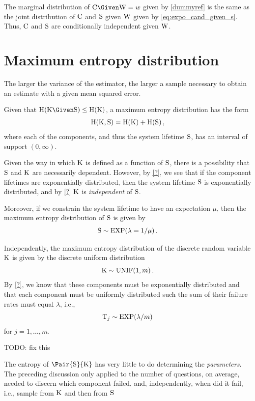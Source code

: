 \documentclass[../main.tex]{subfiles}
\begin{document}
The marginal distribution of $\rvcand \Given \RV{W} = w$ given by \cref{dummyref} is the same as the joint distribution of $\mathrm{C}$ and $\mathrm{S}$ given 
$\mathrm{W}$ given by \cref{eq:expo_cand_given_s}.
Thus, $\mathrm{C}$ and $\mathrm{S}$ are conditionally independent given $\mathrm{W}$.

\section{Maximum entropy distribution}
The larger the variance of the estimator, the larger a sample necessary to obtain an estimate with a given mean squared error.

Given that $\entropy(\RV{K} \Given \sv) \leq \entropy(\RV{K})$, a maximum entropy distribution has the form
\begin{equation}
\operatorname{H}(\mathrm{K}, \mathrm{S}) = \operatorname{H}(\mathrm{K}) + \operatorname{H}(\mathrm{S})\,,
\end{equation}
where each of the components, and thus the system lifetime $\mathrm{S}$, has an interval of support $(0,\infty)$.

Given the way in which $\mathrm{K}$ is defined as a function of $\mathrm{S}$, there is a possibility that $\mathrm{S}$ and $\mathrm{K}$ are necessarily dependent.
However, by \cref{?}, we see that if the component lifetimes are exponentially distributed, then the system lifetime $\mathrm{S}$ is exponentially distributed, and by \cref{?} $\mathrm{K}$ is \emph{independent} of $\mathrm{S}$.

Moreover, if we constrain the system lifetime to have an expectation $\mu$, then the maximum entropy distribution of $\mathrm{S}$ is given by
\begin{equation}
\mathrm{S} \sim \mathrm{EXP}(\lambda = 1 / \mu)\,.
\end{equation}

Independently, the maximum entropy distribution of the discrete random variable $\mathrm{K}$ is given by the discrete uniform distribution
\begin{equation}
\mathrm{K} \sim \mathrm{UNIF}(1,m)\,.
\end{equation}
By \cref{?}, we know that these components must be exponentially distributed and that each component must be uniformly distributed such the sum of their failure rates must equal $\lambda$, i.e.,
\begin{equation}
\mathrm{T}_j \sim \mathrm{EXP}(\lambda / m)
\end{equation}
for $j=1,\ldots,m$.

TODO: fix this

The entropy of $\Pair{\sv}{\RV{K}}$ has very little to do determining the \emph{parameters}. The preceding discussion only applied to the number of questions, on average, needed to discern which component failed, and, independently, when did it fail, i.e., sample from $\mathrm{K}$ and then from $\mathrm{S}$
\end{document}
